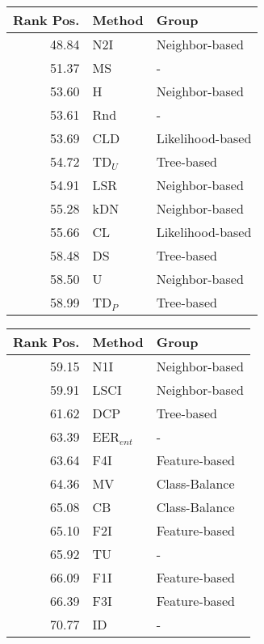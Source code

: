 \begin{tabular}{rll}
\toprule
Rank Pos. & Method & Group \\
\midrule
48.84 & N2I & Neighbor-based \\
51.37 & MS & - \\
53.60 & H & Neighbor-based \\
53.61 & Rnd & - \\
53.69 & CLD & Likelihood-based \\
54.72 & TD$_U$ & Tree-based \\
54.91 & LSR & Neighbor-based \\
55.28 & kDN & Neighbor-based \\
55.66 & CL & Likelihood-based \\
58.48 & DS & Tree-based \\
58.50 & U & Neighbor-based \\
58.99 & TD$_P$ & Tree-based \\
\bottomrule
\end{tabular}
\begin{tabular}{rll}
\toprule
Rank Pos. & Method & Group \\
\midrule
59.15 & N1I & Neighbor-based \\
59.91 & LSCI & Neighbor-based \\
61.62 & DCP & Tree-based \\
63.39 & EER$_{ent}$ & - \\
63.64 & F4I & Feature-based \\
64.36 & MV & Class-Balance \\
65.08 & CB & Class-Balance \\
65.10 & F2I & Feature-based \\
65.92 & TU & - \\
66.09 & F1I & Feature-based \\
66.39 & F3I & Feature-based \\
70.77 & ID & - \\
\bottomrule
\end{tabular}
